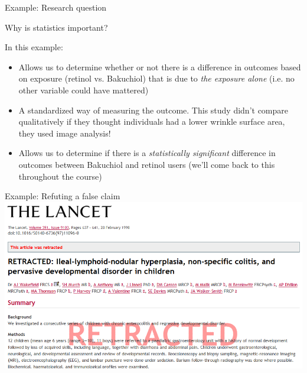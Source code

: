 \documentclass[10pt,t]{beamer}
\begin{document}
\begin{frame}{Example: Research question}

Why is statistics important?

\vspace{0.3cm}

In this example:
\begin{itemize}
	\item Allows us to determine whether or not there is a difference in outcomes based on exposure (retinol vs. Bakuchiol) that is due to \textit{the exposure alone} (i.e. no other variable could have mattered)
	\item A standardized way of measuring the outcome. This study didn't compare qualitatively if they thought individuals had a lower wrinkle surface area, they used image analysis!
	\item Allows us to determine if there is a \textit{statistically significant} difference in outcomes between Bakuchiol and retinol users (we'll come back to this throughout the course)
\end{itemize}

\end{frame}

\begin{frame}[c]{Example: Refuting a false claim}
\centering \includegraphics[scale=0.4]{lancet.png}
\end{frame}
\end{document}

